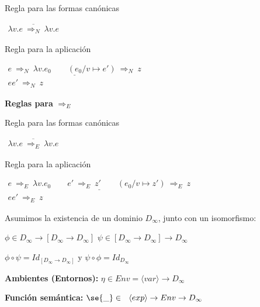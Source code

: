\begin{section}
Regla para las formas canónicas

$\begin{array}{c}
\overline{\lambda v.e\ \Rightarrow_N\ \lambda v.e}
\end{array}
$

\smallskip

Regla para la aplicación

\smallskip

$\begin{array}{c}
\underline{e\ \Rightarrow_N\ \lambda v.e_0\qquad (e_0/v\mapsto e')\ \Rightarrow_N\ z}\\
ee'\ \Rightarrow_N\ z
\end{array}
$

\smallskip

\textbf{Reglas para} $\Rightarrow_E$

Regla para las formas canónicas

$\begin{array}{c}
\overline{\lambda v.e\ \Rightarrow_E\ \lambda v.e}
\end{array}
$

\smallskip

Regla para la aplicación

\smallskip

$\begin{array}{c}
\underline{e\ \Rightarrow_E\ \lambda v.e_0\qquad e'\ \Rightarrow_E\ z'\qquad(e_0/v\mapsto z')\ \Rightarrow_E\ z}\\
ee'\ \Rightarrow_E\ z
\end{array}
$

\clearpage


Asumimos la existencia de un dominio $D_{\infty}$, junto con un
isomorfismo:

$\phi\in D_{\infty}\rightarrow [D_{\infty}\rightarrow D_{\infty}]$
\quad $\psi\in [D_{\infty}\rightarrow D_{\infty}]\rightarrow D_{\infty}$

\smallskip
$\phi \circ \psi = Id_{[D_{\infty}\rightarrow D_{\infty}]}$
y $\psi\circ\phi = Id_{D_{\infty}}$

\medskip

\textbf{Ambientes (Entornos):} $\eta \in Env = \langle var\rangle\rightarrow D_\infty $

\smallskip

\textbf{Función semántica:} $\se{\_}\in\ \ \langle exp\rangle \rightarrow Env\rightarrow D_{\infty}$


\end{section}
